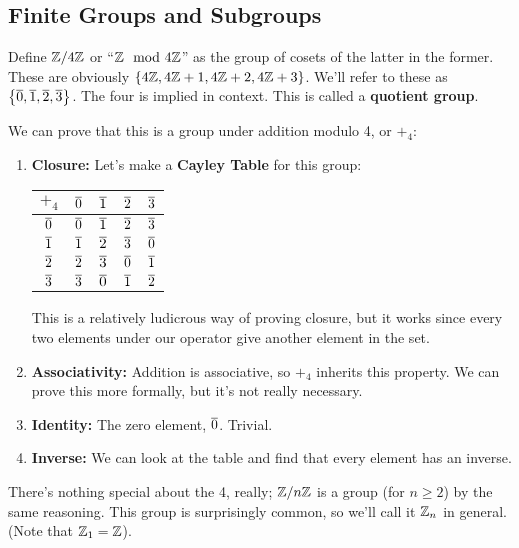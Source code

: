 
\subsection{Finite Groups and Subgroups}
Define $\mathbb{Z}/4\mathbb{Z}$ or ``$\mathbb{Z} \mod 4\mathbb{Z}$'' as the group of cosets of the latter in the former.
These are obviously $\left\{4\mathbb{Z}, 4\mathbb{Z} + 1, 4 \mathbb{Z} + 2, 4\mathbb{Z}+3\right\}$. We'll refer to these as 
$\left\{\overline 0, \overline 1, \overline 2, \overline 3\right\}$. The four is implied in context. 
This is called a \textbf{quotient group}. 

We can prove that this is a group under addition modulo 4, or $+_4$: 

\begin{enumerate}
    \item \textbf{Closure:} Let's make a \textbf{Cayley Table} for this group: 
    \begin{center}
        \begin{tabular}{|c|c|c|c|c|}
            \hline 
            $+_4$ & $\overline{0}$ & $\overline{1}$ & $\overline{2}$ & $\overline{3}$ \\ \hline 
            $\overline{0}$ & $\overline{0}$ & $\overline{1}$ & $\overline{2}$ & $\overline{3}$ \\ \hline 
            $\overline{1}$ & $\overline{1}$ & $\overline{2}$ & $\overline{3}$ & $\overline{0}$ \\ \hline 
            $\overline{2}$ & $\overline{2}$ & $\overline{3}$ & $\overline{0}$ & $\overline{1}$ \\ \hline 
            $\overline{3}$ & $\overline{3}$ & $\overline{0}$ & $\overline{1}$ & $\overline{2}$ \\ \hline 
        \end{tabular}
    \end{center}
    This is a relatively ludicrous way of proving closure, but it works
since every two elements under our operator give another element
in the set.
    \item \textbf{Associativity:} Addition is associative, so $+_4$ inherits this 
    property. We can prove this more formally, but it's not really necessary. 
    \item \textbf{Identity:} The zero element, $\overline{0}$. Trivial. 
    \item \textbf{Inverse:} We can look at the table and ﬁnd that every element has an
    inverse.    
\end{enumerate}
There's nothing special about the 4, really; $\mathbb{Z} / n \mathbb{Z}$ is a group (for $n \geq 2$) by
the same reasoning. This group is surprisingly common, so we'll call it $\mathbb{Z}_n$
in general. (Note that $\mathbb{Z}_1 = \mathbb{Z}$).\\

